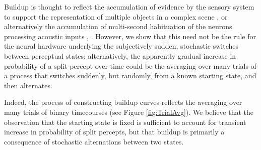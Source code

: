 \documentclass[10pt]{article}
\begin{document}
Buildup is thought to reflect the accumulation of evidence by the sensory system to support the representation of multiple objects in a complex scene \cite{Bregman}, or alternatively the accumulation of multi-second habituation of the neurons processing acoustic inputs \cite{Micheyl2005}, \cite{Pressnitzer2008}. However, we show that this need not be the rule for the neural hardware underlying the subjectively sudden, stochastic switches between perceptual states; alternatively, the apparently gradual increase in probability of a split percept over time could be the averaging over many trials of a process that switches suddenly, but randomly, from a known starting state, and then alternates.

Indeed, the process of constructing buildup curves reflects the averaging over many trials of binary timecourses (see Figure \ref{fig:TrialAvg}). We believe that the observation that the starting state is fixed is sufficient to account for transient increase in probability of split percepts, but that buildup is primarily a consequence of stochastic alternations between two states.
\end{document}
